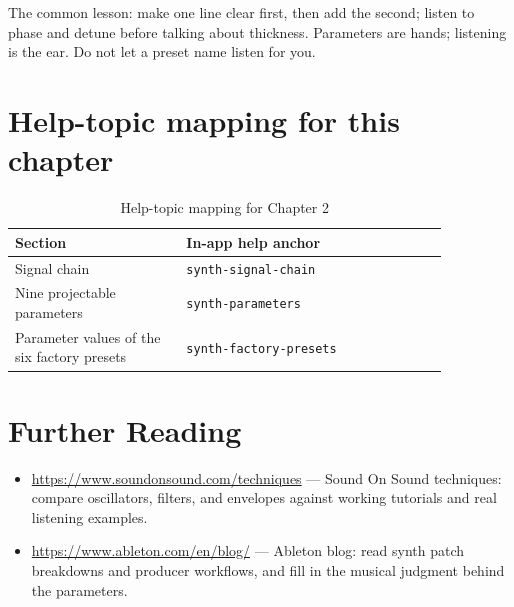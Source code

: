 The common lesson: make one line clear first, then add the second; listen to phase and detune before talking about thickness. Parameters are hands; listening is the ear. Do not let a preset name listen for you.

\section{Help-topic mapping for this chapter}

\begin{table}[htbp]
\centering
\small
\begin{tabular}{@{}p{0.34\linewidth}p{0.52\linewidth}@{}}
\hline
Section & In-app help anchor \\
\hline
Signal chain & \texttt{synth-signal-chain} \\
Nine projectable parameters & \texttt{synth-parameters} \\
Parameter values of the six factory presets & \texttt{synth-factory-presets} \\
\hline
\end{tabular}
\caption{Help-topic mapping for Chapter 2}
\end{table}

\section*{Further Reading}
\begin{itemize}[leftmargin=1.5em]
\item \url{https://www.soundonsound.com/techniques} — Sound On Sound techniques: compare oscillators, filters, and envelopes against working tutorials and real listening examples.
\item \url{https://www.ableton.com/en/blog/} — Ableton blog: read synth patch breakdowns and producer workflows, and fill in the musical judgment behind the parameters.
\end{itemize}
